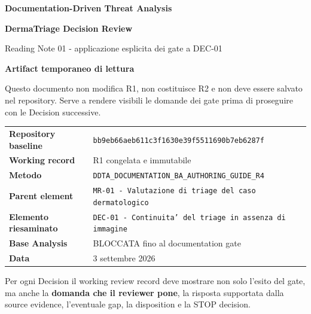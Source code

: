 \documentclass[11pt,a4paper]{article}
\begin{document}

\begin{titlepage}
\thispagestyle{empty}
\vspace*{9mm}
{\sffamily\bfseries\color{DDTANavy}\fontsize{15}{18}\selectfont Documentation-Driven Threat Analysis}\par
\vspace{5mm}
{\sffamily\bfseries\color{DDTANavy}\fontsize{28}{32}\selectfont DermaTriage Decision Review}\par
\vspace{2mm}
{\sffamily\color{DDTABlue}\fontsize{18}{22}\selectfont Reading Note 01 - applicazione esplicita dei gate a DEC-01}\par

\vspace{10mm}
\begin{tcolorbox}[enhanced,arc=3pt,boxrule=0pt,colback=DDTANavy,left=12pt,right=12pt,top=11pt,bottom=11pt]
{\color{white}\sffamily\bfseries\large Artifact temporaneo di lettura}\par
\vspace{2mm}
{\color{white!88}\small Questo documento non modifica R1, non costituisce R2 e non deve essere salvato nel repository. Serve a rendere visibili le domande dei gate prima di proseguire con le Decision successive.}
\end{tcolorbox}

\vspace{8mm}
\begin{tabularx}{\textwidth}{L{45mm}Y}
\toprule
\textbf{Repository baseline} & \texttt{bb9eb66aeb611c3f1630e39f5511690b7eb6287f} \\
\textbf{Working record} & R1 congelata e immutabile \\
\textbf{Metodo} & \texttt{DDTA\_DOCUMENTATION\_BA\_AUTHORING\_GUIDE\_R4} \\
\textbf{Parent element} & \texttt{MR-01 - Valutazione di triage del caso dermatologico} \\
\textbf{Elemento riesaminato} & \texttt{DEC-01 - Continuita' del triage in assenza di immagine} \\
\textbf{Base Analysis} & BLOCCATA fino al documentation gate \\
\textbf{Data} & 3 settembre 2026 \\
\bottomrule
\end{tabularx}

\vfill
\begin{ddtaprinciple}[title={Regola per questa fase}]
Per ogni Decision il working review record deve mostrare non solo l'esito del gate, ma anche la \textbf{domanda che il reviewer pone}, la risposta supportata dalla source evidence, l'eventuale gap, la disposition e la STOP decision.
\end{ddtaprinciple}
\end{titlepage}
\end{document}
